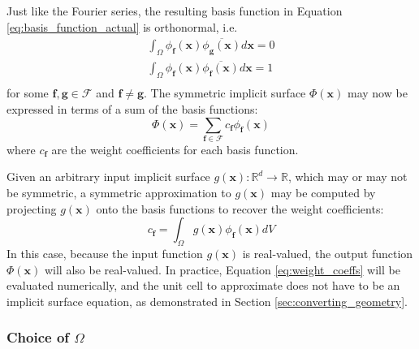 \documentclass[acmtog]{acmart}
\begin{document}
Just like the Fourier series, the resulting basis function in Equation \ref{eq:basis_function_actual} is orthonormal, i.e.
%
\begin{equation}
  \begin{split}
    \int_{\Omega} \phi_{\mathbf{f}}(\mathbf{x}) \overline{\phi_{\mathbf{g}}(\mathbf{x})} d\mathbf{x} = 0 \\
    \int_{\Omega} \phi_{\mathbf{f}}(\mathbf{x}) \overline{\phi_{\mathbf{f}}(\mathbf{x})} d\mathbf{x} = 1 \\
  \end{split}
\end{equation}
%
for some $\mathbf{f}, \mathbf{g} \in \mathcal{F}$ and $\mathbf{f} \neq \mathbf{g}$. The symmetric implicit surface $\Phi(\mathbf{x})$ may now be expressed in terms of a sum of the basis functions:
%
\begin{equation}
  \label{eq:symmetric_implicit_surface}
  \Phi(\mathbf{x}) = \sum\limits_{\mathbf{f} \in \mathcal{F}} c_{\mathbf{f}} \phi_{\mathbf{f}}(\mathbf{x})
\end{equation}
%
where $c_{\mathbf{f}}$ are the weight coefficients for each basis function.

Given an arbitrary input implicit surface $g(\mathbf{x}): \mathbb{R}^d \rightarrow \mathbb{R}$, which may or may not be symmetric, a symmetric approximation to $g(\mathbf{x})$ may be computed by projecting $g(\mathbf{x})$ onto the basis functions to recover the weight coefficients:
%
\begin{equation}
  \label{eq:weight_coeffs}
  c_{\mathbf{f}} = \int_{\Omega} g(\mathbf{x}) \phi_{\mathbf{f}}(\mathbf{x}) dV
\end{equation}
%
In this case, because the input function $g(\mathbf{x})$ is real-valued, the output function $\Phi(\mathbf{x})$ will also be real-valued. In practice, Equation \ref{eq:weight_coeffs} will be evaluated numerically, and the unit cell to approximate does not have to be an implicit surface equation, as demonstrated in Section \ref{sec:converting_geometry}.

\subsubsection{Choice of $\Omega$}
\end{document}
